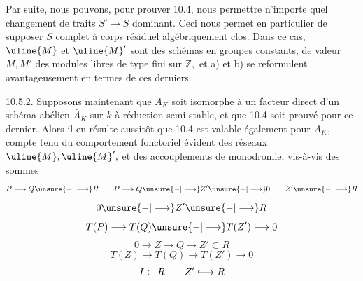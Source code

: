 Par suite, nous pouvons, pour prouver 10.4, nous permettre n'importe quel changement de traits \(S'\longrightarrow S\) dominant. Ceci nous permet en particulier de supposer \(S\) complet à corps résiduel algébriquement clos. Dans ce cas, \(\uline{M}\) et \(\uline{M}'\) sont des schémas en groupes constants, de valeur \(M,M'\) des modules libres de type fini sur \(\mathbb Z,\) et a) et b) se reformulent avantageusement en termes de ces derniers.

10.5.2. Supposons maintenant que \(A_K\) soit isomorphe à un facteur direct d'un schéma abélien \(\bar A_K\) sur \(k\) à réduction semi-stable, et que 10.4 soit prouvé pour ce dernier. Alors il en résulte aussitôt que 10.4 est valable également pour \(A_K,\) compte tenu du comportement fonctoriel évident des réseaux \(\uline{M},\uline{M}',\) et des accouplements de monodromie, vis-à-vis des sommes
\[
P\longrightarrow Q\unsure{-|\longrightarrow}R\qquad P\longrightarrow Q\unsure{-|\longrightarrow}Z'\unsure{-|\longrightarrow}0\qquad Z'\unsure{-|\longrightarrow}R
\]
\[
0\unsure{-|\longrightarrow}Z'\unsure{-|\longrightarrow}R
\]
\[
T(P)\longrightarrow T(Q)\unsure{-|\longrightarrow}T(Z')\longrightarrow0
\]
\[
0\longrightarrow Z\longrightarrow Q\longrightarrow Z'\subset R
\]
\[
T(Z)\longrightarrow T(Q)\longrightarrow T(Z')\longrightarrow0
\]
\[I\subset R\qquad Z'\lhook\joinrel\longrightarrow R\]
